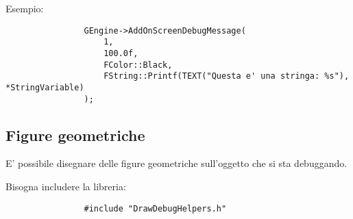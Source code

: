             Esempio:
            \begin{verbatim}
                GEngine->AddOnScreenDebugMessage(
                    1,
                    100.0f,
                    FColor::Black,
                    FString::Printf(TEXT("Questa e' una stringa: %s"), *StringVariable)
                );
            \end{verbatim}

        \subsection{Figure geometriche}

            E' possibile disegnare delle figure geometriche sull'oggetto che si sta debuggando.

            Bisogna includere la libreria:
            \begin{verbatim}
                #include "DrawDebugHelpers.h"
            \end{verbatim}


